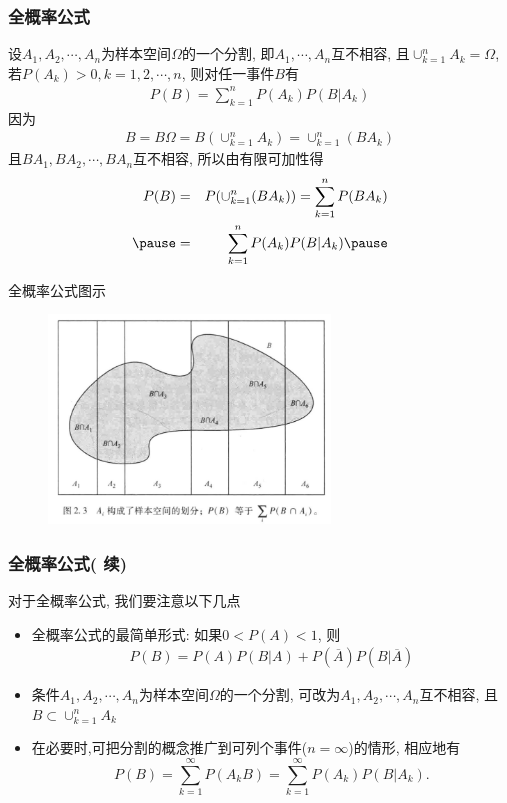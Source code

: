 \begin{frame}
  \frametitle{全概率公式}
  \begin{thm}[\textcolor{red}{全概率公式}] 设$A_1,A_2,\cdots,A_n$为样本空间$\Omega$的一个分割, 即$A_1,\cdots,A_n$互不相容, 且$\cup_{k=1}^nA_k=\Omega$, 若$P(A_k)>0, k=1,2,\cdots,n$, 则对任一事件$B$有
    \begin{eqnarray*}
      P(B)=\sum_{k=1}^nP(A_k)P(B|A_k)
    \end{eqnarray*}
    \pause \zheng 因为
    \begin{eqnarray*}
      B=B\Omega=B(\cup_{k=1}^nA_k)=\cup_{k=1}^n(BA_k)
    \end{eqnarray*}
    \pause 且$BA_1,BA_2,\cdots,BA_n$互不相容, 所以由有限可加性得
    \pause
    \begin{eqnarray*}
      P(B)&=&P(\cup_{k=1}^n(BA_k))=\sum_{k=1}^nP(BA_k)\\ \pause
          &=&\sum_{k=1}^nP(A_k)P(B|A_k)\pause
    \end{eqnarray*}
  \end{thm}
\end{frame}



\begin{frame}{全概率公式图示}
    \begin{figure}[全概率公式.png]
      \centering
      \includegraphics[width=7.5cm]{figures/全概率公式.png}
    \end{figure}

\end{frame}
\begin{frame}
  \frametitle{全概率公式( 续)}
  对于全概率公式, 我们要注意以下几点
  \begin{itemize}[<+-|alert@+>]
  \item 全概率公式的最简单形式: 如果$0<P(A)<1$, 则
    \begin{eqnarray*}
      P(B)=P(A)P(B|A)+P(\overline{A})P(B|\overline{A})
    \end{eqnarray*}
  \item 条件$A_1,A_2,\cdots,A_n$为样本空间$\Omega$的一个分割, 可改为$A_1,A_2,\cdots,A_n$互不相容, 且$B\subset \cup_{k=1}^nA_k$
  \item 在必要时,可把分割的概念推广到可列个事件($n=\infty$)的情形, 相应地有\pause
  $$ P(B)=\sum_{k=1}^{\infty} P(A_kB)=\sum_{k=1}^{\infty} P(A_k) P(B|A_k).$$
  \end{itemize}
\end{frame}



